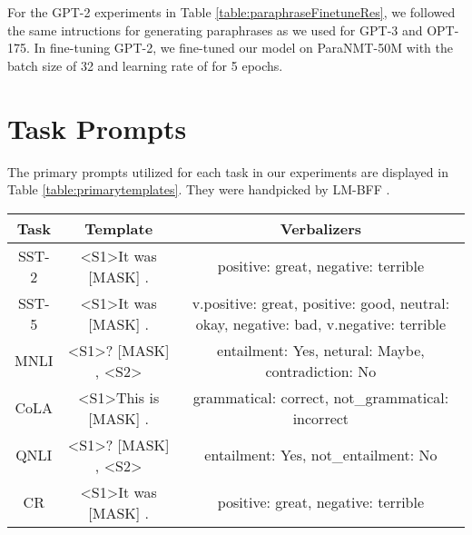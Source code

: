 \documentclass[11pt]{article}
\begin{document}
For the GPT-2 experiments in Table \ref{table:paraphraseFinetuneRes}, we followed the same intructions for generating paraphrases as we used for GPT-3 and OPT-175. In fine-tuning GPT-2, we fine-tuned our model on ParaNMT-50M \cite{wieting-gimpel-2018-paranmt} with the batch size of 32 and learning rate of  for 5 epochs.

\section{Task Prompts}
\label{appendix:TaskPrompt}

The primary prompts utilized for each task in our experiments are displayed in Table \ref{table:primarytemplates}. They were handpicked by LM-BFF \cite{gao2021making}.

\begin{table*}[!ht]
    \centering
    \small
    \begin{tabular}{c|cc}
    \hline
    Task  & Template                                                             & Verbalizers                                                                           \\ \hline
    SST-2 & \textless{}S1\textgreater It was {[}MASK{]} .                        & positive: great, negative: terrible                                                   \\
    SST-5 & \textless{}S1\textgreater It was {[}MASK{]} .                        & v.positive: great, positive: good, neutral: okay, negative: bad, v.negative: terrible \\
    MNLI  & \textless{}S1\textgreater ? {[}MASK{]} , \textless{}S2\textgreater{} & entailment: Yes, netural: Maybe, contradiction: No                                    \\
    CoLA  & \textless{}S1\textgreater This is {[}MASK{]} .                       & grammatical: correct, not\_grammatical: incorrect                                     \\
    QNLI  & \textless{}S1\textgreater ? {[}MASK{]} , \textless{}S2\textgreater{} & entailment: Yes, not\_entailment: No                                                  \\
    CR    & \textless{}S1\textgreater It was {[}MASK{]} .                        & positive: great, negative: terrible                                                   \\ \hline
    \end{tabular}
    \caption{Primary templates and verbalizers (label words) used in our experiments.}
    \label{table:primarytemplates}
\end{table*}
\end{document}
